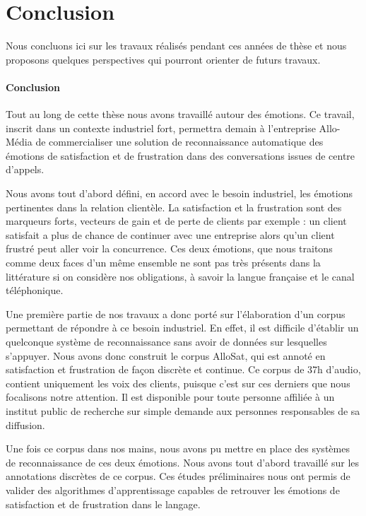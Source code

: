 \chapter*{Conclusion}

Nous concluons ici sur les travaux réalisés pendant ces années de thèse et nous proposons quelques perspectives qui pourront orienter de futurs travaux.

\subsubsection{Conclusion}
Tout au long de cette thèse nous avons travaillé autour des émotions. Ce travail, inscrit dans un contexte industriel fort, permettra demain à l'entreprise Allo-Média de commercialiser une solution de reconnaissance automatique des émotions de satisfaction et de frustration dans des conversations issues de centre d'appels.

Nous avons tout d'abord défini, en accord avec le besoin industriel, les émotions pertinentes dans la relation clientèle. La satisfaction et la frustration sont des marqueurs forts, vecteurs de gain et de perte de clients par exemple : un client satisfait a plus de chance de continuer avec une entreprise alors qu'un client frustré peut aller voir la concurrence. Ces deux émotions, que nous traitons comme deux faces d'un même ensemble ne sont pas très présents dans la littérature si on considère nos obligations, à savoir la langue française et le canal téléphonique.

Une première partie de nos travaux a donc porté sur l'élaboration d'un corpus permettant de répondre à ce besoin industriel. En effet, il est difficile d'établir un quelconque système de reconnaissance sans avoir de données sur lesquelles s'appuyer. Nous avons donc construit le corpus AlloSat, qui est annoté en satisfaction et frustration de façon discrète et continue. Ce corpus de 37h d'audio, contient uniquement les voix des clients, puisque c'est sur ces derniers que nous focalisons notre attention. Il est disponible pour toute personne affiliée à un institut public de recherche sur simple demande aux personnes responsables de sa diffusion.

Une fois ce corpus dans nos mains, nous avons pu mettre en place des systèmes de reconnaissance de ces deux émotions. Nous avons tout d'abord travaillé sur les annotations discrètes de ce corpus. Ces études préliminaires nous ont permis de valider des algorithmes d'apprentissage capables de retrouver les émotions de satisfaction et de frustration dans le langage.

